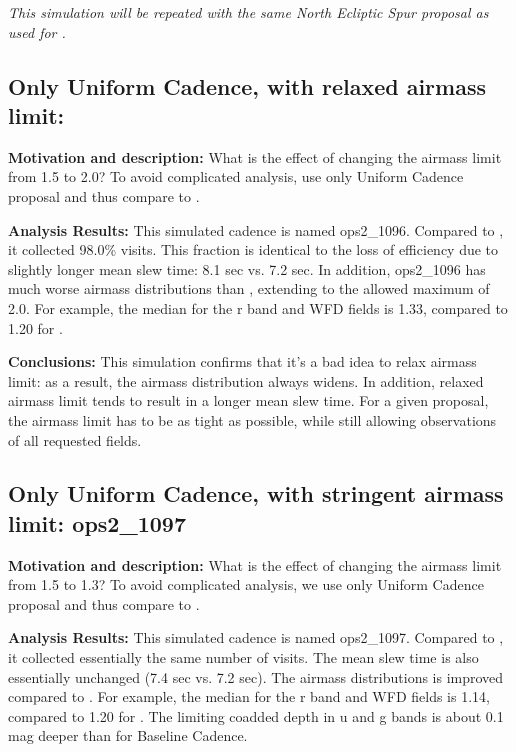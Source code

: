 {\it This simulation will
be repeated with the same North Ecliptic Spur proposal as used for .}


\subsection{Only Uniform Cadence, with relaxed airmass limit: }


{\bf Motivation and description:}  What is the effect of changing the airmass
limit from 1.5 to 2.0?  To avoid complicated analysis, use only Uniform Cadence proposal
and thus compare to .


{\bf Analysis Results:}  This simulated cadence is named ops2\_1096.  Compared
to , it collected 98.0\% visits. This fraction is identical to the loss of
efficiency due to slightly longer mean slew time: 8.1 sec vs. 7.2 sec. In addition,
ops2\_1096 has much worse airmass distributions than ,  extending
to the allowed maximum of 2.0. For example, the median for the r band and WFD fields
is 1.33, compared to 1.20 for .

{\bf Conclusions:} This simulation confirms that it's a bad idea to relax airmass limit:
as a result, the airmass distribution always widens. In addition, relaxed airmass limit
tends to result in a longer mean slew time.  For a given proposal, the airmass limit
has to be as tight as possible, while still allowing observations of all requested fields.



\subsection{Only Uniform Cadence, with stringent airmass limit: ops2\_1097}

{\bf Motivation and description:} What is the effect of changing the airmass
limit from 1.5 to 1.3? To avoid complicated analysis, we use only Uniform Cadence proposal
and thus compare to .


 {\bf Analysis Results:}  This simulated cadence is named ops2\_1097.  Compared
to , it collected essentially the same number of visits. The mean slew time
is also essentially unchanged (7.4 sec vs. 7.2 sec). The airmass distributions is improved
compared to . For example, the median for the r band and WFD fields
is 1.14, compared to 1.20 for .  The limiting coadded depth in u and g
bands is about 0.1 mag deeper than for Baseline Cadence.


